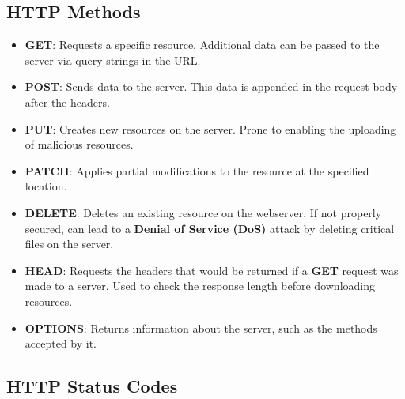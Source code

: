 \documentclass[12pt, letterpaper]{article}
\begin{document}
\subsection*{HTTP Methods}

\begin{itemize}
    \item \textbf{GET}: Requests a specific resource. Additional data can be passed to the server via query strings in the URL.
    \item \textbf{POST}: Sends data to the server. This data is appended in the request body after the headers.
    \item \textbf{PUT}: Creates new resources on the server. Prone to enabling the uploading of malicious resources.
    \item \textbf{PATCH}: Applies partial modifications to the resource at the specified location.
    \item \textbf{DELETE}: Deletes an existing resource on the webserver. If not properly secured, can lead to a \textbf{Denial of Service (DoS)} attack by deleting critical files on the server.
    \item \textbf{HEAD}: Requests the headers that would be returned if a \textbf{GET} request was made to a server. Used to check the response length before downloading resources.
    \item \textbf{OPTIONS}: Returns information about the server, such as the methods accepted by it.
\end{itemize}

\subsection*{HTTP Status Codes}
\end{document}
